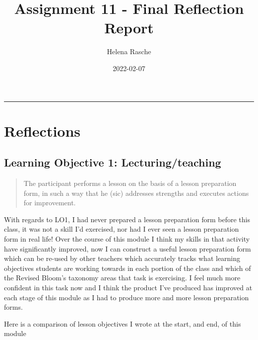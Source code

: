 \documentclass[paper=a4,justified,a4paper]{tufte-handout}
\title[A11 - Final Reflection]{Assignment 11 - Final Reflection Report}
\author{Helena Rasche}
\date{2022-02-07}
\begin{document}
\maketitle
\noindent\rule{5in}{0.4pt}


\hypertarget{reflections}{%
\section{Reflections}\label{reflections}}

\hypertarget{learning-objective-1-lecturingteaching}{%
\subsection{Learning Objective 1:
Lecturing/teaching}\label{learning-objective-1-lecturingteaching}}

\begin{quote}
The participant performs a lesson on the basis of a lesson preparation
form, in such a way that he (sic) addresses strengths and executes
actions for improvement.
\end{quote}

With regards to LO1, I had never prepared a lesson preparation form
before this class, it was not a skill I'd exercised, nor had I ever seen
a lesson preparation form in real life! Over the course of this module I
think my skills in that activity have significantly improved, now I can
construct a useful lesson preparation form which can be re-used by other
teachers which accurately tracks what learning objectives students are
working towards in each portion of the class and which of the Revised
Bloom's taxonomy areas that task is exercising. I feel much more
confident in this task now and I think the product I've produced has
improved at each stage of this module as I had to produce more and more
lesson preparation forms.

Here is a comparison of lesson objectives I wrote at the start, and end,
of this module
\end{document}
